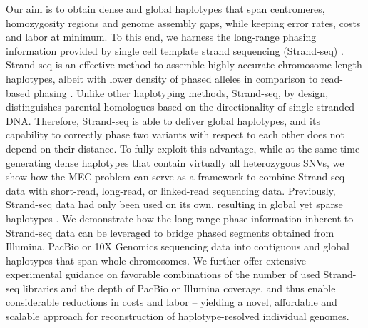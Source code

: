 Our aim is to obtain dense and global haplotypes that span centromeres, homozygosity regions and genome assembly gaps, while keeping error rates, costs and labor at minimum. 
To this end, we harness the long-range phasing information provided by single cell template strand sequencing (Strand-seq) \citep{falconer2012dna, sanders2017single}. Strand-seq is an effective method to assemble highly 
accurate chromosome-length haplotypes, albeit with lower density of phased alleles in comparison to read-based phasing \citep{Porubsky2016}. 
Unlike other haplotyping methods, Strand-seq, by design, distinguishes parental homologues based on the directionality of single-stranded DNA. 
Therefore, Strand-seq is able to deliver global haplotypes, and its capability to correctly phase two variants with respect to each other does not depend on their distance. 
To fully exploit this advantage, while at the same time generating dense haplotypes that contain virtually all heterozygous SNVs, we show how the MEC problem can serve as a framework to combine 
Strand-seq data with short-read, long-read, or linked-read sequencing data. 
Previously, Strand-seq data had only been used on its own, resulting in global yet sparse haplotypes \citep{Porubsky2016}. 
We demonstrate how the long range phase information inherent to Strand-seq data can be leveraged to bridge phased segments obtained from Illumina, PacBio or 10X Genomics sequencing data into contiguous and global haplotypes that span whole chromosomes.
We further offer extensive experimental guidance on favorable combinations of the number of used Strand-seq libraries and the depth of PacBio or Illumina coverage, 
and thus enable considerable reductions in costs and labor – yielding a novel, affordable and scalable approach for reconstruction of haplotype-resolved individual genomes.

